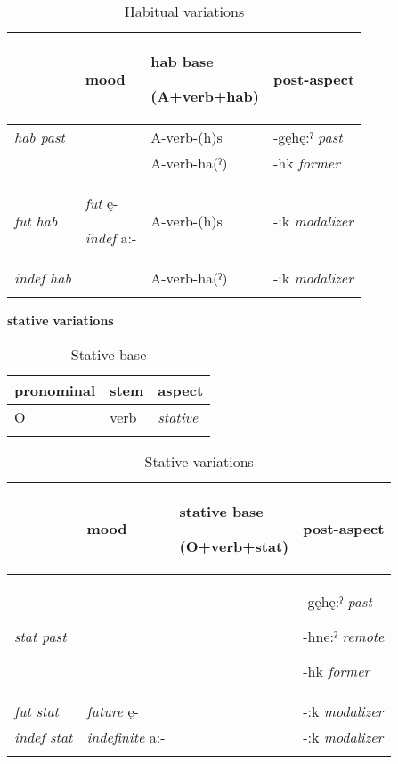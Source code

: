 \begin{table}
\caption{Habitual variations}
\label{tab:1:habvariations}
\scriptsize{
\begin{tabularx}{\textwidth}{XXXX}
\lsptoprule
& mood & hab base 

(A+verb+hab) & post-aspect\\
\midrule
{\itshape hab past} &  & A-verb-(h)s & {}-gęhę:ˀ \textit{past}\\
&  & A-verb-ha(ˀ) & {}-hk \textit{former}

\\
{\itshape fut hab} & \textit{fut} ę- 

\textit{indef} a:-

& A-verb-(h)s & {}-:k \textit{modalizer}\\
{\itshape indef hab} &  & A-verb-ha(ˀ) & {}-:k \textit{modalizer}\\
\lspbottomrule
\end{tabularx}}
\end{table}


\textbf{stative} \textbf{variations}


\begin{table}
\caption{Stative base}
\label{tab:1:statbase}
\scriptsize{
\begin{tabularx}{.66\textwidth}{XXX}
\lsptoprule
pronominal & stem & aspect \\
\midrule
O & verb & {\itshape stative}\\
\lspbottomrule
\end{tabularx}}
\end{table}

\lipsum[1-1]

\begin{table}
\caption{Stative variations}
\label{tab:1:statvar}
\scriptsize{
\begin{tabularx}{\textwidth}{XXXX}
\lsptoprule
& mood & stative base

(O+verb+stat) & post-aspect \\
\midrule
{\itshape stat past} &  &  & {}-gęhę:ˀ \textit{past}

{}-hne:ˀ \textit{remote}

{}-hk \textit{former}

\\
{\itshape fut stat} & \textit{future} ę- &  & {}-:k \textit{modalizer}

\\
{\itshape indef stat} & \textit{indefinite} a:- &  & {}-:k \textit{modalizer}\\
\lspbottomrule
\end{tabularx}}
\end{table}



